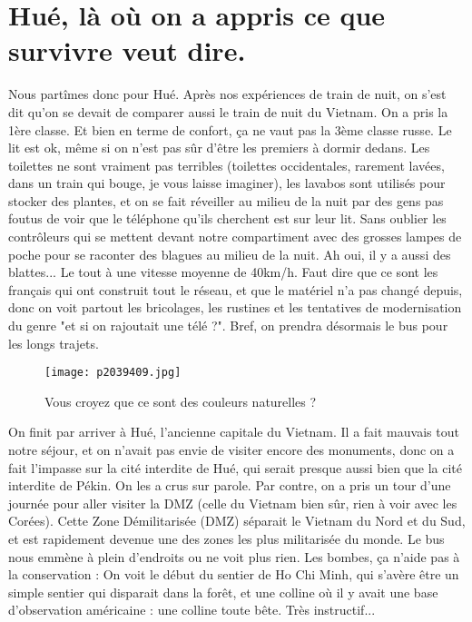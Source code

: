 \documentclass{book}
\begin{document}
\chapter{Hué, là où on a appris ce que survivre veut dire.}
Nous partîmes donc pour Hué. Après nos expériences de train de nuit, on s'est dit qu'on se devait de comparer aussi le train de nuit du Vietnam. On a pris la 1ère classe. Et bien en terme de confort, ça ne vaut pas la 3ème classe russe. Le lit est ok, même si on n'est pas sûr d'être les premiers à dormir dedans. Les toilettes ne sont vraiment pas terribles (toilettes occidentales, rarement lavées, dans un train qui bouge, je vous laisse imaginer), les lavabos sont utilisés pour stocker des plantes, et on se fait réveiller au milieu de la nuit par des gens pas foutus de voir que le téléphone qu'ils cherchent est sur leur lit. Sans oublier les contrôleurs qui se mettent devant notre compartiment avec des grosses lampes de poche pour se raconter des blagues au milieu de la nuit. Ah oui, il y a aussi des blattes... Le tout à une vitesse moyenne de 40km/h. Faut dire que ce sont les français qui ont construit tout le réseau, et que le matériel n'a pas changé depuis, donc on voit partout les bricolages, les rustines et les tentatives de modernisation du genre "et si on rajoutait une télé ?". Bref, on prendra désormais le bus pour les longs trajets.


\begin{figure}[h]
\centering
\texttt{[image: p2039409.jpg]}
\caption*{Vous croyez que ce sont des couleurs naturelles ?}
\end{figure}

On finit par arriver à Hué, l'ancienne capitale du Vietnam. Il a fait mauvais tout notre séjour, et on n'avait pas envie de visiter encore des monuments, donc on a fait l'impasse sur la cité interdite de Hué, qui serait presque aussi bien que la cité interdite de Pékin. On les a crus sur parole. Par contre, on a pris un tour d'une journée pour aller visiter la DMZ (celle du Vietnam bien sûr, rien à voir avec les Corées). Cette Zone Démilitarisée (DMZ) séparait le Vietnam du Nord et du Sud, et est rapidement devenue une des zones les plus militarisée du monde. Le bus nous emmène à plein d'endroits ou ne voit plus rien. Les bombes, ça n'aide pas à la conservation : On voit le début du sentier de Ho Chi Minh, qui s'avère être un simple sentier qui disparait dans la forêt, et une colline où il y avait une base d'observation américaine : une colline toute bête. Très instructif...
\end{document}
